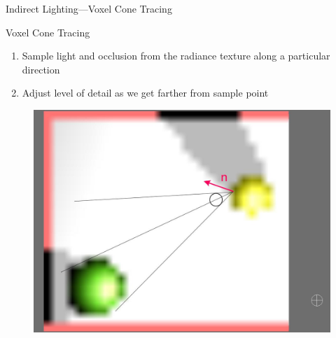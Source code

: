 \documentclass[10pt]{beamer}
\begin{document}
{
\begin{frame}{Indirect Lighting---Voxel Cone Tracing}
      \begin{block}{Voxel Cone Tracing}
        \begin{enumerate}
          \item Sample light and occlusion from the radiance texture along a particular direction
          \item Adjust level of detail as we get farther from sample point
        \end{enumerate}
      \end{block}

      \begin{figure}
        \includegraphics[height=0.5\textheight]{conetrace2}
      \end{figure}
\end{frame}}
\end{document}
